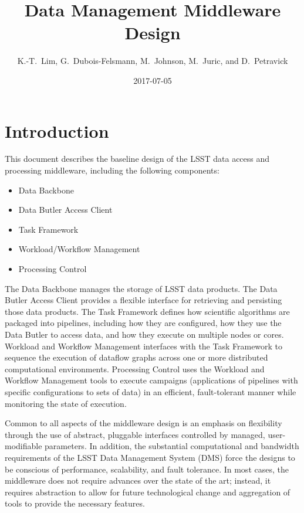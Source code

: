 \documentclass[DM,toc]{lsstdoc}
\title{Data Management Middleware Design}
\author{
	K.-T.~Lim,
	G.~Dubois-Felsmann,
	M.~Johnson,
	M.~Juric,
	and
	D.~Petravick
}
\date{2017-07-05}
\begin{document}
\maketitle

\section{Introduction}\label{introduction}

This document describes the baseline design of the LSST data access and
processing middleware, including the following components:

\begin{itemize}
	\item Data Backbone
	\item Data Butler Access Client
	\item Task Framework
	\item Workload/Workflow Management
	\item Processing Control
\end{itemize}

The Data Backbone manages the storage of LSST data products.  The Data Butler
Access Client provides a flexible interface for retrieving and persisting those
data products.  The Task Framework defines how scientific algorithms are
packaged into pipelines, including how they are configured, how they use the
Data Butler to access data, and how they execute on multiple nodes or cores.
Workload and Workflow Management interfaces with the Task Framework to sequence
the execution of dataflow graphs across one or more distributed computational
environments.  Processing Control uses the Workload and Workflow Management
tools to execute campaigns (applications of pipelines with specific
configurations to sets of data) in an efficient, fault-tolerant manner while
monitoring the state of execution.

Common to all aspects of the middleware design is an emphasis on
flexibility through the use of abstract, pluggable interfaces controlled
by managed, user-modifiable parameters. In addition, the substantial
computational and bandwidth requirements of the LSST Data Management
System (DMS) force the designs to be conscious of performance,
scalability, and fault tolerance. In most cases, the middleware does not
require advances over the state of the art; instead, it requires
abstraction to allow for future technological change and aggregation of
tools to provide the necessary features.
\end{document}

